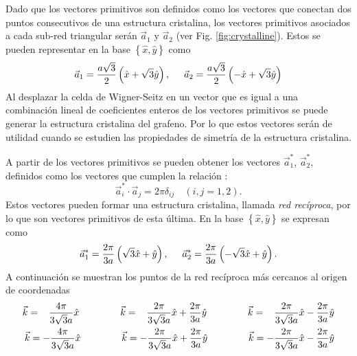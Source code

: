 Dado que los vectores primitivos son definidos como los vectores que conectan dos puntos consecutivos de una estructura cristalina, los vectores primitivos asociados a cada sub-red triangular serán $\vec{a}_1$ y $\vec{a}_2$ (ver Fig. \ref{fig:crystalline}). Estos se pueden representar en la base $\left\{\hat{x},\hat{y}\right\}$ como
\begin{equation}
	\vec{a}_1 = \frac{a\sqrt{3}}{2}\left(\hat{x}+\sqrt{3} \hat{y}\right),\hspace{0.5cm}\vec{a}_2= \frac{a \sqrt{3}}{2}\left(-\hat{x}+\sqrt{3} \hat{y}\right)\label{eq:primitive}
\end{equation}
Al desplazar la celda de Wigner-Seitz en un vector que es igual a una combinación lineal de coeficientes enteros de los vectores primitivos se puede generar la estructura cristalina del grafeno. Por lo que estos vectores serán de utilidad cuando se estudien las propiedades de simetría de la estructura cristalina.\par
A partir de los vectores primitivos se pueden obtener los vectores $\vec{a}_1^{\ast}$, $\vec{a}_2^{\ast}$, definidos como los vectores que cumplen la relación \cite{Bradley2009}:
\begin{equation}
	\vec{a}^{\ast}_i\cdot \vec{a}_j = 2\pi\delta_{ij} \quad \left(i,j = 1,2\right).
\end{equation}
Estos vectores pueden formar una estructura cristalina, llamada \emph{red recíproca}, por lo que son vectores primitivos de esta última. En la base $\left\{\hat{x}, \hat{y}\right\}$ se expresan como 
\begin{equation}
	\vec{a}^{\ast}_1 = \frac{2\pi}{3a}\left(\sqrt{3}\hat{x}+\hat{y}\right),\hspace{0.5cm}\vec{a}^{\ast}_2= \frac{2\pi}{3a}\left(-\sqrt{3}\hat{x}+\hat{y}\right).\label{eq:recipprimitive}
\end{equation}
A continuación se muestran los puntos de la red recíproca más cercanos al origen de coordenadas
\begin{equation}
  \begin{aligned}[b]
    \vec{k} = \hspace{0.3cm}\frac{4\pi}{3\sqrt{3}a}\hat{x}\hspace{1.5cm} \vec{k} = \hspace{0.3cm}\frac{2\pi}{3\sqrt{3}a} \hat{x}+ \frac{2\pi}{3a} \hat{y} \hspace{1.5cm} \vec{k} = \hspace{0.3cm}\frac{2\pi}{3\sqrt{3}a} \hat{x} -\frac{2\pi}{3a} \hat{y}                                                                          \\
	\vec{k} = -\frac{4\pi}{3\sqrt{3}a}\hat{x}  \hspace{1.5cm} \vec{k} = -\frac{2\pi}{3\sqrt{3}a} \hat{x}+\frac{2\pi}{3a} \hat{y} \hspace{1.5cm} \vec{k} = -\frac{2\pi}{3\sqrt{3}a} \hat{x}-\frac{2\pi}{3a} \hat{y}
\end{aligned}
\end{equation}
